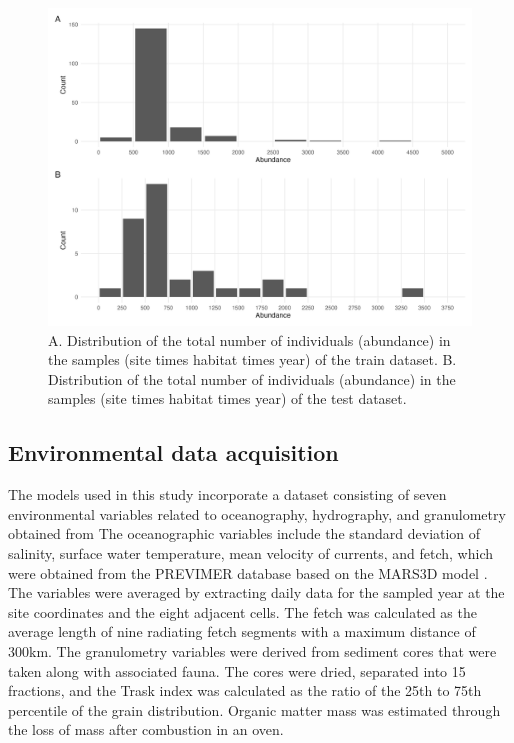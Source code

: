 \begin{figure}
\hypertarget{fig:chapt1supp4}{%
\centering
\includegraphics{03-Chapitre1/figures/supplementary/fig_supp4.png}
\caption{A. Distribution of the total number of individuals (abundance)
in the samples (site times habitat times year) of the train dataset. B.
Distribution of the total number of individuals (abundance) in the
samples (site times habitat times year) of the test
dataset.}\label{fig:chapt1supp4}
}
\end{figure}

\hypertarget{environmental-data-acquisition}{%
\subsection*{Environmental data
acquisition}\label{environmental-data-acquisition}}

The models used in this study incorporate a dataset consisting of seven
environmental variables related to oceanography, hydrography, and
granulometry obtained from \textcite{Boye_2019b} The oceanographic
variables include the standard deviation of salinity, surface water
temperature, mean velocity of currents, and fetch, which were obtained
from the PREVIMER database \autocite{Lecornu_2009} based on the MARS3D
model \autocite{Lazure_2008}. The variables were averaged by extracting
daily data for the sampled year at the site coordinates and the eight
adjacent cells. The fetch was calculated as the average length of nine
radiating fetch segments with a maximum distance of 300km. The
granulometry variables were derived from sediment cores that were taken
along with associated fauna. The cores were dried, separated into 15
fractions, and the Trask index was calculated as the ratio of the 25th
to 75th percentile of the grain distribution. Organic matter mass was
estimated through the loss of mass after combustion in an oven.

